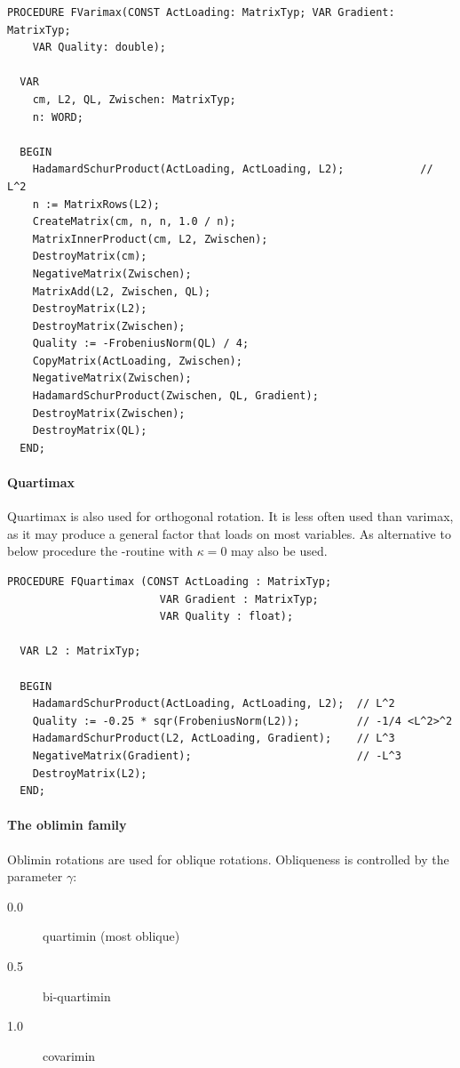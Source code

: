 \begin{lstlisting}[caption=Varimax]
  PROCEDURE FVarimax(CONST ActLoading: MatrixTyp; VAR Gradient: MatrixTyp;
    VAR Quality: double);

  VAR
    cm, L2, QL, Zwischen: MatrixTyp;
    n: WORD;

  BEGIN
    HadamardSchurProduct(ActLoading, ActLoading, L2);            // L^2
    n := MatrixRows(L2);
    CreateMatrix(cm, n, n, 1.0 / n);
    MatrixInnerProduct(cm, L2, Zwischen);
    DestroyMatrix(cm);
    NegativeMatrix(Zwischen);
    MatrixAdd(L2, Zwischen, QL);
    DestroyMatrix(L2);
    DestroyMatrix(Zwischen);
    Quality := -FrobeniusNorm(QL) / 4;
    CopyMatrix(ActLoading, Zwischen);
    NegativeMatrix(Zwischen);
    HadamardSchurProduct(Zwischen, QL, Gradient);
    DestroyMatrix(Zwischen);
    DestroyMatrix(QL);
  END;
\end{lstlisting}

\paragraph{Quartimax}

Quartimax is also used for orthogonal rotation. It is less often used than varimax, as it may produce a general factor that loads on most variables. As alternative to below procedure the -routine with \(\kappa = 0 \) may also be used.

\begin{lstlisting}[caption=Quartimax]
  PROCEDURE FQuartimax (CONST ActLoading : MatrixTyp;
                        VAR Gradient : MatrixTyp;
                        VAR Quality : float);

  VAR L2 : MatrixTyp;

  BEGIN
    HadamardSchurProduct(ActLoading, ActLoading, L2);  // L^2
    Quality := -0.25 * sqr(FrobeniusNorm(L2));         // -1/4 <L^2>^2
    HadamardSchurProduct(L2, ActLoading, Gradient);    // L^3
    NegativeMatrix(Gradient);                          // -L^3
    DestroyMatrix(L2);
  END;
\end{lstlisting}


\paragraph{The oblimin family}

Oblimin rotations are used for oblique rotations. Obliqueness is controlled by the parameter \(\gamma \):
\begin{description}
  \item[0.0]{quartimin (most oblique)}
  \item[0.5]{bi-quartimin}
  \item[1.0]{covarimin}
\end{description}

